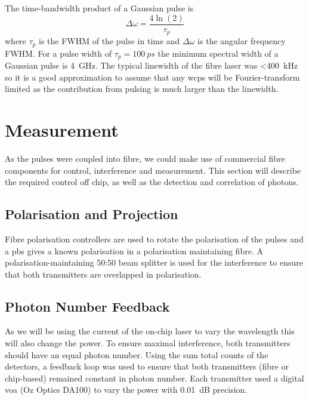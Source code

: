 The time-bandwidth product of a Gaussian pulse is
\begin{equation}
	\Delta \omega = \frac{4 \ln(2)}{\tau_p}
\end{equation}
where $\tau_p$ is the \ac{FWHM} of the pulse in time and $\Delta \omega$ is the angular frequency \ac{FWHM}. For a pulse width of $\tau_p = \SI{100}{ps}$ the minimum spectral width of a Gaussian pulse is \SI{4}{GHz}. The typical linewidth of the fibre laser was \SI{<400}{\kilo\Hz} so it is a good approximation to assume that any \acp{wcp} will be Fourier-transform limited as the contribution from pulsing is much larger than the linewidth.

\section{Measurement}



As the pulses were coupled into fibre, we could make use of commercial fibre components for control, interference and measurement. This section will describe the required control off chip, as well as the detection and correlation of photons.

\subsection{Polarisation and Projection}

Fibre polarisation controllers are used to rotate the polarisation of the pulses and a \ac{pbs} gives a known polarisation in a polarisation maintaining fibre. A polarisation-maintaining {50:50} beam splitter is used for the interference to ensure that both transmitters are overlapped in polarisation.

\subsection{Photon Number Feedback}

As we will be using the current of the on-chip laser to vary the wavelength this will also change the power. To ensure maximal interference, both transmitters should have an equal photon number. Using the sum total counts of the detectors, a feedback loop was used to ensure that both transmitters (fibre or chip-based) remained constant in photon number. Each transmitter used a digital \ac{voa} (Oz Optics DA100) to vary the power with \SI{0.01}{dB} precision.


